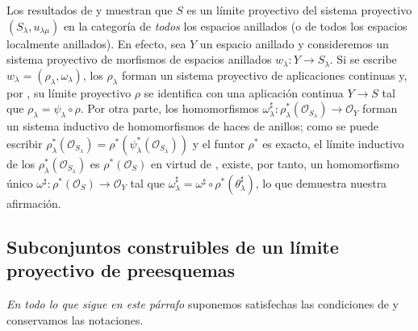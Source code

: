 \begin{remark}[8.2.14]
\label{IV.8.2.14-fr}
Los resultados de  y  muestran que $S$ es un límite proyectivo del sistema proyectivo $(S_\lambda,u_{\lambda\mu})$ en la categoría de \emph{todos} los espacios anillados (o de todos los espacios localmente anillados).
En efecto, sea $Y$ un espacio anillado y consideremos un sistema proyectivo de morfismos de espacios anillados $w_\lambda:Y\to S_\lambda$.
Si se escribe $w_\lambda=(\rho_\lambda,\omega_\lambda)$, los $\rho_\lambda$ forman un sistema proyectivo de aplicaciones continuas y, por , su límite proyectivo $\rho$ se identifica con una aplicación continua $Y\to S$ tal que $\rho_\lambda=\psi_\lambda\circ\rho$. Por otra parte, los homomorfismos
$\omega_\lambda^\sharp:
\rho_\lambda^*(\mathcal O_{S_\lambda})\to\mathcal O_Y$
forman un sistema inductivo de homomorfismos de haces de anillos; como se puede escribir
$\rho_\lambda^*(\mathcal O_{S_\lambda})=
\rho^*(\psi_\lambda^*(\mathcal O_{S_\lambda}))$
y el funtor $\rho^*$ es exacto, el límite inductivo de los $\rho_\lambda^*(\mathcal O_{S_\lambda})$ es $\rho^*(\mathcal O_S)$ en virtud de , existe, por tanto, un homomorfismo único
$\omega^\sharp:\rho^*(\mathcal O_S)\to\mathcal O_Y$
tal que $\omega_\lambda^\sharp=\omega^\sharp\circ
\rho^*(\theta_\lambda^\sharp)$, lo que demuestra nuestra afirmación.
\end{remark}

\subsection{Subconjuntos construibles de un límite proyectivo de preesquemas}
\label{subsection:IV.8.3-fr}

\begin{env}[8.3.1]
\label{IV.8.3.1-fr}
\emph{En todo lo que sigue en este párrafo} suponemos satisfechas las condiciones de  y conservamos las notaciones.
\end{env}

